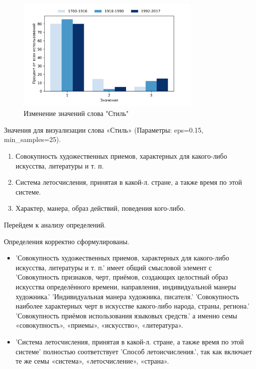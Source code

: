 \begin{figure}[H]
	\centering
	\includegraphics[width=0.8\textwidth]{img/visualizations/stil'_minimal}
	\caption{Изменение значений слова "Стиль"}
	\label{fig:Стиль_книга}
\end{figure}

Значения для визуализации слова «Стиль» (Параметры: eps=0.15, min\_samples=25).

\begin{enumerate}
    \item Совокупность художественных приемов, характерных для какого-либо искусства, литературы и т. п.
    \item Система летосчисления, принятая в какой-л. стране, а также время по этой системе.
    \item Характер, манера, образ действий, поведения кого-либо.
\end{enumerate}

Перейдем к анализу определений.

Определения корректно сформулированы.

\begin{itemize}
    \item ’Совокупность художественных приемов, характерных для какого-либо искусства, литературы и т. п.’ имеет общий смысловой элемент с
’Совокупность признаков, черт, приёмов, создающих целостный образ искусства определённого времени, направления, индивидуальной манеры художника.’
’Индивидуальная манера художника, писателя.’
’Совокупность наиболее характерных черт в искусстве какого-либо народа, страны, региона.’
’Совокупность приёмов использования языковых средств.’
а именно семы «совокупность», «приемы», «искусство», «литература».

    \item ’Система летосчисления, принятая в какой-л. стране, а также время по этой системе’ полностью соответствует
’Способ летоисчисления.’, так как включает те же семы «система», «летосчисление», «страна».
\end{itemize}

